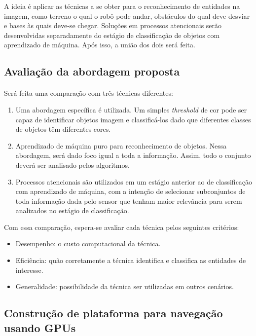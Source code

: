 \documentclass[8pt]{article}
\newcommand{\tit}[1]{\textit{#1}}
\begin{document}
\begin{multicols}{2}
A ideia é aplicar as técnicas a se obter para o reconhecimento
de entidades na imagem, como terreno o qual o robô pode andar, obstáculos do
qual deve desviar e bases às quais deve-se chegar.
Soluções em processos atencionais serão desenvolvidas separadamente do
estágio de classificação de objetos com aprendizado de máquina. 
Após isso, a união dos dois será feita.

\subsection{Avaliação da abordagem proposta}
\paragraph{}
Será feita uma comparação com três técnicas diferentes: 
\begin{enumerate}
	\item Uma abordagem específica é utilizada.  
		Um simples \tit{threshold} de cor pode ser capaz de identificar objetos
		imagem e classificá-los dado que diferentes classes de objetos têm
		diferentes cores.
	\item Aprendizado de máquina puro para reconhecimento de objetos.
		Nessa abordagem, será dado foco igual a toda a informação. 
		Assim, todo o conjunto deverá ser analisado pelos algoritmos.
	\item Processos atencionais são utilizados em um estágio anterior ao de 
		classificação com aprendizado de máquina, com a intenção de selecionar
		subconjuntos de toda informação dada pelo sensor que tenham maior 
		relevância para serem analizados no estágio de classificação.
\end{enumerate}

Com essa comparação, espera-se avaliar cada técnica pelos seguintes critérios:
\begin{itemize}
	\item Desempenho: o custo computacional da técnica.
	\item Eficiência: quão corretamente a técnica identifica e classifica
		as entidades de interesse.
	\item Generalidade: possibilidade da técnica ser utilizadas em outros 
		cenários.
\end{itemize}

\subsection{Construção de plataforma para navegação usando GPUs}

\end{multicols}
\end{document}
